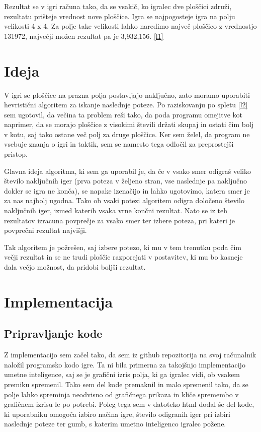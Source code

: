 \documentclass[a4paper,11pt]{article}
\begin{document}
Rezultat se v igri računa tako, da se vsakič, ko igralec dve ploščici združi, rezultatu prišteje vrednost nove ploščice. Igra se najpogosteje igra na polju velikosti 4 x 4. Za polje take velikosti lahko naredimo največ ploščico z vrednostjo 131972, največji možen rezultat pa je 3,932,156. \ref{l1}

\section{Ideja}
V igri se ploščice na prazna polja postavljajo naključno, zato moramo uporabiti hevristični algoritem za iskanje naslednje poteze. Po raziskovanju po spletu \ref{l2} sem ugotovil, da večina ta problem reši tako, da poda programu omejitve kot naprimer, da se morajo ploščice z visokimi števili držati skupaj in ostati čim bolj v kotu, saj tako ostane več polj za druge ploščice. Ker sem želel, da program ne vsebuje znanja o igri in taktik, sem se namesto tega odločil za preprostejši pristop.

Glavna ideja algoritma, ki sem ga uporabil je, da če v vsako smer odigraš veliko število naključnih iger (prva poteza v željeno stran, vse naslednje pa naključno dokler se igra ne konča), se napake izenačijo in lahko ugotovimo, katera smer je za nas najbolj ugodna. Tako ob vsaki potezi algoritem odigra določeno število naključnih iger, izmed katerih vsaka vrne končni rezultat. Nato se iz teh rezultatov izracuna povprečje za vsako smer ter izbere poteza, pri kateri je povprečni rezultat najvišji.

Tak algoritem je požrešen, saj izbere potezo, ki mu v tem trenutku poda čim večji rezultat in se ne trudi ploščic razporejati v postavitev, ki mu bo kasneje dala večjo možnost, da pridobi boljši rezultat.

\section{Implementacija}
\subsection{Pripravljanje kode}
Z implementacijo sem začel tako, da sem iz github repozitorija na svoj računalnik naložil programsko kodo igre. Ta ni bila primerna za takojšnjo implementacijo umetne inteligence, saj se je grafični izris polja, ki ga igralec vidi, ob vsakem premiku spremenil. Tako sem del kode premaknil in malo spremenil tako, da se polje lahko spreminja neodvisno od grafičnega prikaza in kliče spremembo v grafičnem izrisu le po potrebi. Poleg tega sem v datoteko html dodal še del kode, ki uporabniku omogoča izbiro načina igre, število odigranih iger pri izbiri naslednje poteze ter gumb, s katerim umetno inteligenco igralec požene.
\end{document}
